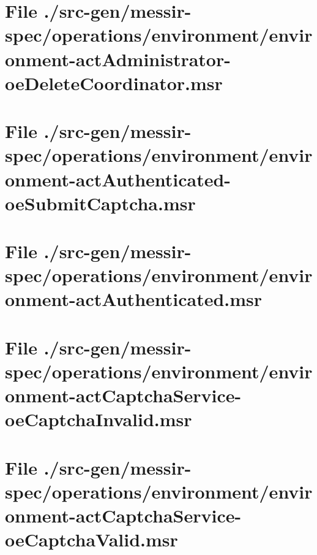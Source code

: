 \section[File /src-gen.../environment-actAdministrator-oeDeleteCoordinator.msr]{File ./src-gen/messir-spec/operations/environment/environment-actAdministrator-oeDeleteCoordinator.msr}
\scriptsize

\normalsize
	
\section[File /src-gen/messir-spec.../environment-actAuthenticated-oeSubmitCaptcha.msr]{File ./src-gen/messir-spec/operations/environment/environment-actAuthenticated-oeSubmitCaptcha.msr}
\scriptsize

\normalsize
	
\section[File /src-gen/messir-spec/operations.../environment-actAuthenticated.msr]{File ./src-gen/messir-spec/operations/environment/environment-actAuthenticated.msr}
\scriptsize

\normalsize
	
\section[File /src-gen/messir-spec.../environment-actCaptchaService-oeCaptchaInvalid.msr]{File ./src-gen/messir-spec/operations/environment/environment-actCaptchaService-oeCaptchaInvalid.msr}
\scriptsize

\normalsize
	
\section[File /src-gen/messir-spec.../environment-actCaptchaService-oeCaptchaValid.msr]{File ./src-gen/messir-spec/operations/environment/environment-actCaptchaService-oeCaptchaValid.msr}
\scriptsize

\normalsize
	
